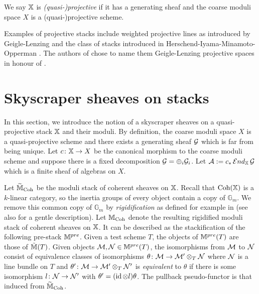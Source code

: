 \documentclass[12pt]{amsart}
\begin{document}
\begin{definition}
We say $\mathbb{X}$ is {\em (quasi-)projective} if it has a generating sheaf and the coarse moduli space $X$ is a (quasi-)projective scheme.
\end{definition}

Examples of projective stacks include weighted projective lines as introduced by Geigle-Lenzing \cite{GL} and the class of stacks introduced in Herschend-Iyama-Minamoto-Opperman \cite{HIMO}.
The authors of \cite{HIMO} chose to name them Geigle-Lenzing projective spaces in honour of \cite{GL}.

\section{Skyscraper sheaves on stacks}
\label{sec:sky}

In this section, we introduce the notion of a skyscraper sheaves on a quasi-projective stack $\mathbb{X}$ and their moduli. By definition, the coarse moduli space $X$ is a quasi-projective scheme and there exists a generating sheaf $\mathcal{G}$ which is far from being unique. Let $c \colon \mathbb{X} \rightarrow X$ be the canonical morphism to the coarse moduli scheme and suppose there is a fixed decomposition $\mathcal{G} = \oplus_i \mathcal{G}_i$. Let $\mathcal{A} := c_* \mathop{{\mathcal{E}}nd}\nolimits_{\mathbb{X}} \mathcal{G}$ which is a finite sheaf of algebras on $X$.

Let $\widetilde{\mathbb{M}}_{\operatorname{Coh}}$ be the moduli stack of coherent sheaves on $\mathbb{X}$. Recall that $\operatorname{Coh}(\mathbb{X})$ is a $k$-linear category, so the inertia groups of every object contain a copy of $\mathbb{G}_m$. We remove this common copy of $\mathbb{G}_m$ by {\em rigidification} as defined for example in \cite[Section~5]{ACV} (see also \cite[Section~2.3]{CL} for a gentle description). Let $\mathbb{M}_{\operatorname{Coh}}$ denote the resulting rigidified moduli stack of coherent sheaves on $\mathbb{X}$. It can be described as the stackification of the following pre-stack $\mathbb{M}^{pre}$. Given a test scheme $T$, the objects of $\mathbb{M}^{pre}(T)$ are those of $\tilde{\mathbb{M}}(T)$. Given objects $\mathcal{M}, \mathcal{N} \in \mathbb{M}^{pre}(T)$, the isomorphisms from $\mathcal{M}$ to $\mathcal{N}$ consist of equivalence classes of isomorphisms $\theta \colon \mathcal{M} \to \mathcal{M}' \otimes_T \mathcal{N}$ where $\mathcal{N}$ is a line bundle on $T$ and $\theta' \colon \mathcal{M} \to \mathcal{M}' \otimes_T \mathcal{N}'$ is {\em equivalent} to $\theta$ if there is some isomorphism $l \colon \mathcal{N} \to \mathcal{N}'$ with $\theta' = (\operatorname{id} \otimes l) \theta$. The pullback pseudo-functor is that induced from $\widetilde{\mathbb{M}}_{\operatorname{Coh}}$. 
\end{document}
